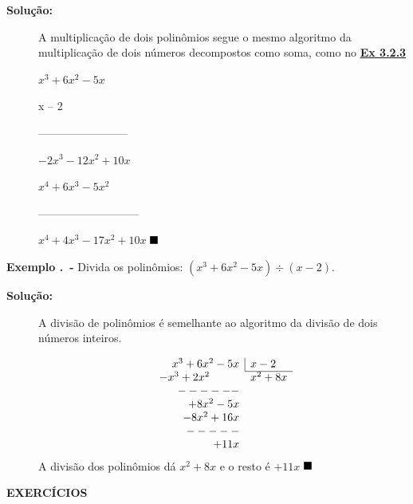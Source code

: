 \begin{description}
\item[\textbf{Solução:}]
A multiplicação de dois polinômios segue o mesmo algoritmo da multiplicação de dois números decompostos como soma, como no \hyperref[ex:3.2.3]{\textbf{Ex 3.2.3}}

\hspace{8mm}$x^3 + 6x^2 - 5x$
                
\hspace{23mm}x – 2
		      			 
\hspace{4mm}------------------------
				
\hspace{4mm} $-2x^3 -12x^2  + 10x$
       		       	          
$x^4 +6x^3 -5x^2 $ 
		                
---------------------------
			
$x^4  +  4x^3  -17x^2  + 10x$ $\qedsymbol$
\end{description}


\textbf{Exemplo \thesubsection.\theexemplo~-} Divida os polinômios: $(x^3 + 6x^2 - 5x) \div (x - 2)$.

\begin{description}
\item[\textbf{Solução:}]
A divisão de polinômios é semelhante ao algoritmo da divisão de dois números inteiros.

\[
\begin{array}{rl}
x^3 + 6x^2 - 5x & \myrule{x-2} \\
\cline{2-2}
-x^3 + 2x^2~~~~~~~~ & x^2  + 8x \\
------\\
+8x^2-5x\\
-8x^2+16x\\
-----\\
+11x
\end{array}
\]
A divisão dos polinômios dá $x^2  + 8x$ e o resto é $+11x$ $\qedsymbol$

\end{description}

\noindent\textbf{EXERCÍCIOS \thesubsection}

